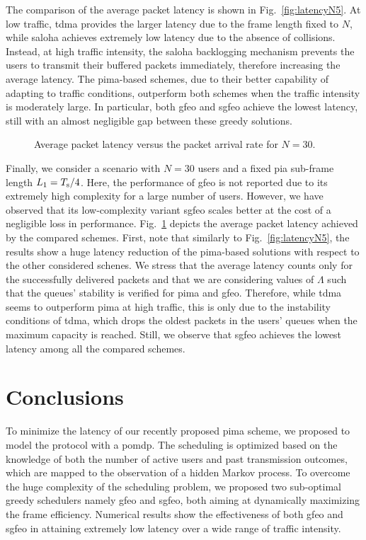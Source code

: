 \documentclass[conference]{IEEEtran}
\newlength\fheight
\newlength\fwidth
\begin{document}
The comparison of the average packet latency is shown in Fig.~\ref{fig:latencyN5}.
At low traffic, \ac{tdma} provides the larger latency due to the frame length fixed to $N$, while \ac{saloha} achieves extremely low latency due to the absence of collisions. Instead, at high traffic intensity, the \ac{saloha} backlogging mechanism prevents the users to transmit their buffered packets immediately, therefore increasing the average latency. The \ac{pima}-based schemes, due to their better capability of adapting to traffic conditions, outperform both schemes when the traffic intensity is moderately large. In particular, both \ac{gfeo} and \ac{sgfeo} achieve the lowest latency, still with an almost negligible gap between these greedy solutions.
\begin{figure}
    \centering
    \setlength{}
    \setlength{}
       
    \caption{Average packet latency versus the packet arrival rate for $N = 30$.}
    \label{fig:latencyN30}
    \vspace{-5pt}
\end{figure}

Finally, we consider a scenario with $N = 30$ users and a fixed \ac{pia} sub-frame length $L_1 = T_{\rm s}/4$. Here, the performance of \ac{gfeo} is not reported due to its extremely high complexity for a large number of users. However, we have observed that its low-complexity variant \ac{sgfeo} scales better at the cost of a negligible loss in performance.
Fig.~\ref{fig:latencyN30} depicts the average packet latency achieved by the compared schemes. First, note that similarly to Fig.~\ref{fig:latencyN5}, the results show a huge latency reduction of the \ac{pima}-based solutions with respect to the other considered schenes. 
We stress that the average latency counts only for the successfully delivered packets and that we are considering values of $\Lambda$ such that the queues' stability is verified for \ac{pima} and \ac{gfeo}. 
Therefore, while \ac{tdma} seems to outperform \ac{pima} at high traffic, this is only due to the instability conditions of \ac{tdma}, which drops the oldest packets in the users' queues when the maximum capacity is reached.
Still, we observe that \ac{sgfeo} achieves the lowest latency among all the compared schemes.
\balance 

\section{Conclusions}\label{sec:conclusions}
To minimize the latency of our recently proposed \ac{pima} scheme, we proposed to model the protocol with a \ac{pomdp}.
The scheduling is optimized based on the knowledge of both the number of active users and past transmission outcomes, which are mapped to the observation of a hidden Markov process. To overcome the huge complexity of the scheduling problem, we proposed two sub-optimal greedy schedulers namely \ac{gfeo} and \ac{sgfeo}, both aiming at dynamically maximizing the frame efficiency. Numerical results show the effectiveness of both \ac{gfeo} and \ac{sgfeo} in attaining extremely low latency over a wide range of traffic intensity.




\end{document}
